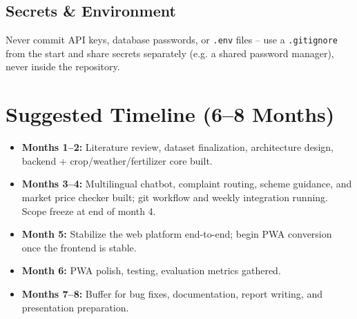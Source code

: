 \documentclass[11pt,a4paper]{article}
\begin{document}
\subsection{Secrets \& Environment}
Never commit API keys, database passwords, or \texttt{.env} files -- use
a \texttt{.gitignore} from the start and share secrets separately
(e.g. a shared password manager), never inside the repository.

\section{Suggested Timeline (6--8 Months)}
\begin{itemize}[leftmargin=*]
  \item \textbf{Months 1--2:} Literature review, dataset finalization,
    architecture design, backend + crop/weather/fertilizer core built.
  \item \textbf{Months 3--4:} Multilingual chatbot, complaint routing,
    scheme guidance, and market price checker built; git workflow and
    weekly integration running. Scope freeze at end of month 4.
  \item \textbf{Month 5:} Stabilize the web platform end-to-end; begin
    PWA conversion once the frontend is stable.
  \item \textbf{Month 6:} PWA polish, testing, evaluation metrics
    gathered.
  \item \textbf{Months 7--8:} Buffer for bug fixes, documentation, report
    writing, and presentation preparation.
\end{itemize}
\end{document}
